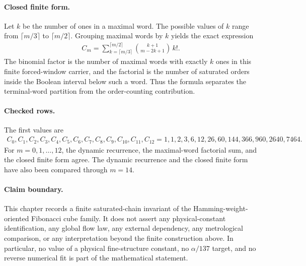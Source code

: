 \paragraph{Closed finite form.}
Let $k$ be the number of ones in a maximal word. The possible values of $k$ range from $\lceil m/3\rceil$ to $\lceil m/2\rceil$. Grouping maximal words by $k$ yields the exact expression
$$
\begin{aligned}
C_m=\sum_{k=\lceil m/3\rceil}^{\lceil m/2\rceil} {k+1 \choose m-2k+1}\, k!.
\end{aligned}
$$
The binomial factor is the number of maximal words with exactly $k$ ones in this finite forced-window carrier, and the factorial is the number of saturated orders inside the Boolean interval below such a word. Thus the formula separates the terminal-word partition from the order-counting contribution.

\paragraph{Checked rows.}
The first values are
$$
\begin{aligned}
C_0,C_1,C_2,C_3,C_4,C_5,C_6,C_7,C_8,C_9,C_{10},C_{11},C_{12}
=1,1,2,3,6,12,26,60,144,366,960,2640,7464.
\end{aligned}
$$
For $m=0,1,\ldots,12$, the dynamic recurrence, the maximal-word factorial sum, and the closed finite form agree. The dynamic recurrence and the closed finite form have also been compared through $m=14$.

\paragraph{Claim boundary.}
This chapter records a finite saturated-chain invariant of the Hamming-weight-oriented Fibonacci cube family. It does not assert any physical-constant identification, any global flow law, any external dependency, any metrological comparison, or any interpretation beyond the finite construction above. In particular, no value of a physical fine-structure constant, no $\alpha/137$ target, and no reverse numerical fit is part of the mathematical statement.
